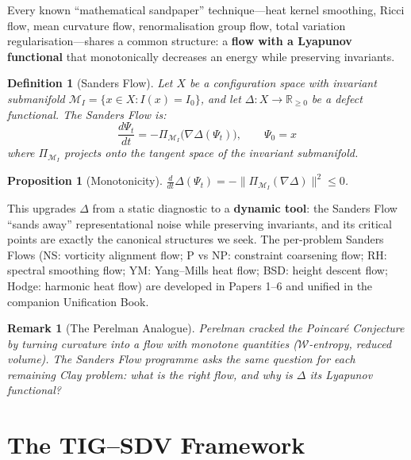 \documentclass[11pt]{article}
\newtheorem{proposition}[theorem]{Proposition}
\newtheorem{definition}[theorem]{Definition}
\newtheorem{remark}[theorem]{Remark}
\begin{document}
Every known ``mathematical sandpaper'' technique---heat kernel smoothing, Ricci flow,
mean curvature flow, renormalisation group flow, total variation regularisation---shares
a common structure: a \textbf{flow with a Lyapunov functional} that monotonically
decreases an energy while preserving invariants.

\begin{definition}[Sanders Flow]\label{def:sanders-flow}
Let $X$ be a configuration space with invariant submanifold
$\mathcal{M}_I = \{x \in X : I(x) = I_0\}$, and let $\Delta : X \to \mathbb{R}_{\geq 0}$
be a defect functional. The \emph{Sanders Flow} is:
\[
  \frac{d\Psi_t}{dt} = -\Pi_{\mathcal{M}_I}\!\bigl(\nabla \Delta(\Psi_t)\bigr),
  \qquad \Psi_0 = x
\]
where $\Pi_{\mathcal{M}_I}$ projects onto the tangent space of the invariant submanifold.
\end{definition}

\begin{proposition}[Monotonicity]
$\frac{d}{dt}\Delta(\Psi_t) = -\|\Pi_{\mathcal{M}_I}(\nabla\Delta)\|^2 \leq 0$.
\end{proposition}

\noindent
This upgrades $\Delta$ from a static diagnostic to a \textbf{dynamic tool}: the Sanders
Flow ``sands away'' representational noise while preserving invariants, and its critical
points are exactly the canonical structures we seek.  The per-problem Sanders Flows
(NS: vorticity alignment flow; P vs NP: constraint coarsening flow; RH: spectral
smoothing flow; YM: Yang--Mills heat flow; BSD: height descent flow; Hodge: harmonic
heat flow) are developed in Papers 1--6 and unified in the companion Unification Book.

\begin{remark}[The Perelman Analogue]
Perelman cracked the Poincar\'e Conjecture by turning curvature into a flow with
monotone quantities ($\mathcal{W}$-entropy, reduced volume).  The Sanders Flow
programme asks the same question for each remaining Clay problem: \emph{what is the
right flow, and why is $\Delta$ its Lyapunov functional?}
\end{remark}

\section{The TIG--SDV Framework}
\label{sec:framework}
\end{document}
